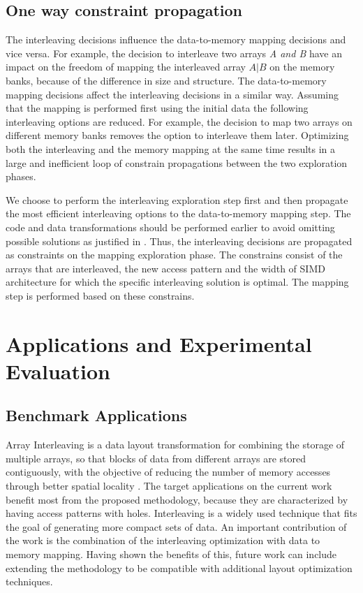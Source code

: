 \documentclass[prodmode,acmtecs]{acmsmall}
\begin{document}
\subsection{One way constraint propagation}

The interleaving decisions influence the data-to-memory mapping decisions and vice versa.
For example, the decision to interleave two arrays \textit{A and B} have an impact on the freedom of mapping the interleaved array $A\vert B$ on the memory banks, because of the difference in size and structure.
The data-to-memory mapping decisions affect the interleaving decisions in a similar way.
Assuming that the mapping is performed first using the initial data the following interleaving options are reduced.
For example, the decision to map two arrays on different memory banks removes the option to interleave them later.
Optimizing both the interleaving and the memory mapping at the same time results in a large and inefficient loop of constrain propagations between the two exploration phases.
 
We choose to perform the interleaving exploration step first and then propagate the most efficient interleaving options to the data-to-memory mapping step.
The code and data transformations should be performed earlier to avoid omitting possible solutions as justified in \cite{dtse}.
Thus, the interleaving decisions are propagated as constraints on the mapping exploration phase. 
The constrains consist of the arrays that are interleaved, the new access pattern and the width of SIMD architecture for which the specific interleaving solution is optimal.
The mapping step is performed based on these constrains.

\section{Applications and Experimental Evaluation}
\label{sec:applications}

\subsection{Benchmark Applications}

Array Interleaving is a data layout transformation for combining the storage of multiple arrays, so that blocks of data from different arrays are stored contiguously, with the objective of reducing the number of memory accesses through better spatial locality \cite{sharma2015array}.
The target applications on the current work benefit most from the proposed methodology, because they are characterized by having access patterns with holes.
Interleaving is a widely used technique that fits the goal of generating more compact sets of data.
An important contribution of the work is the combination of the interleaving optimization with data to memory mapping. 
Having shown the benefits of this, future work can include extending the methodology to be compatible with additional layout optimization techniques.
\end{document}
